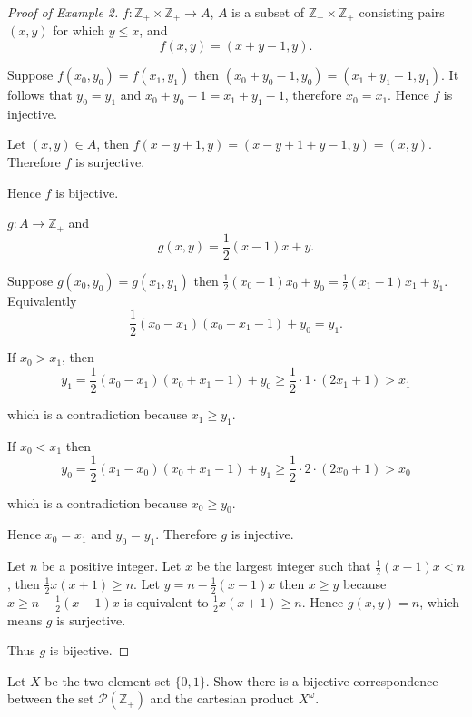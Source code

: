 \begin{proof}[Proof of Example 2]
    $f: \mathbb{Z}_{+}\times\mathbb{Z}_{+} \to A$, $A$ is a subset of $\mathbb{Z}_{+}\times\mathbb{Z}_{+}$ consisting pairs $(x, y)$ for which $y\leq x$, and
    \[
        f(x, y) = (x + y - 1, y).
    \]

    Suppose $f(x_{0}, y_{0}) = f(x_{1}, y_{1})$ then $(x_{0} + y_{0} - 1, y_{0}) = (x_{1} + y_{1} - 1, y_{1})$. It follows that $y_{0} = y_{1}$ and $x_{0} + y_{0} - 1 = x_{1} + y_{1} - 1$, therefore $x_{0} = x_{1}$. Hence $f$ is injective.

    Let $(x, y)\in A$, then $f(x - y + 1, y) = (x - y + 1 + y - 1, y) = (x, y)$. Therefore $f$ is surjective.

    Hence $f$ is bijective.

    \bigskip
    $g: A\to\mathbb{Z}_{+}$ and
    \[
        g(x, y) = \frac{1}{2}(x - 1)x + y.
    \]

    Suppose $g(x_{0}, y_{0}) = g(x_{1}, y_{1})$ then $\frac{1}{2}(x_{0} - 1)x_{0} + y_{0} = \frac{1}{2}(x_{1} - 1)x_{1} + y_{1}$. Equivalently
    \[
        \frac{1}{2}(x_{0} - x_{1})(x_{0} + x_{1} - 1) + y_{0} = y_{1}.
    \]

    If $x_{0} > x_{1}$, then
    \[
        y_{1} = \frac{1}{2}(x_{0} - x_{1})(x_{0} + x_{1} - 1) + y_{0} \geq \frac{1}{2}\cdot 1\cdot (2x_{1} + 1) > x_{1}
    \]

    which is a contradiction because $x_{1}\geq y_{1}$.

    If $x_{0} < x_{1}$ then
    \[
        y_{0} = \frac{1}{2}(x_{1} - x_{0})(x_{0} + x_{1} - 1) + y_{1} \geq \frac{1}{2}\cdot 2\cdot (2x_{0} + 1) > x_{0}
    \]

    which is a contradiction because $x_{0}\geq y_{0}$.

    Hence $x_{0} = x_{1}$ and $y_{0} = y_{1}$. Therefore $g$ is injective.

    Let $n$ be a positive integer. Let $x$ be the largest integer such that $\frac{1}{2}(x - 1)x < n$, then $\frac{1}{2}x(x + 1)\geq n$. Let $y = n - \frac{1}{2}(x - 1)x$ then $x\geq y$ because $x\geq n - \frac{1}{2}(x - 1)x$ is equivalent to $\frac{1}{2}x(x + 1)\geq n$. Hence $g(x, y) = n$, which means $g$ is surjective.

    Thus $g$ is bijective.
\end{proof}

\begin{exercise}\label{chapter1:section7:exercise3}
    Let $X$ be the two-element set $\{ 0, 1 \}$. Show there is a bijective correspondence between the set $\mathscr{P}(\mathbb{Z}_{+})$ and the cartesian product $X^{\omega}$.
\end{exercise}

